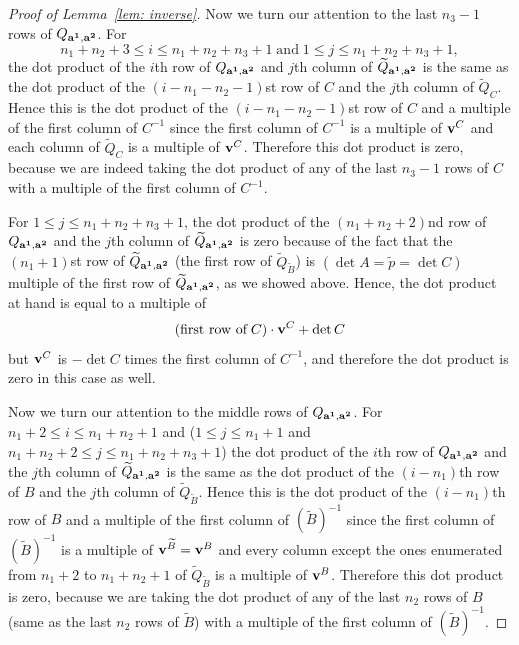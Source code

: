 \documentclass[11pt]{amsart}
\theoremstyle{plain}
\theoremstyle{definition}
\theoremstyle{remark}
\numberwithin{theorem}{section}
\begin{document}
\begin{proof} [Proof of Lemma~\ref{lem: inverse}]
Now we turn our attention to the last $n_3-1$  rows of $Q_{{\bf a^1}, {\bf a^2}}$. For $$n_1+n_2+3 \leq i \leq n_1+n_2+n_3+1\; \mbox{and}\; 1 \leq j \leq n_1+n_2+n_3+1,$$ the dot product of the $i$th row of $Q_{{\bf a^1}, {\bf a^2}}$ and $j$th  column of $\widetilde{Q}_{{\bf a^1}, {\bf a^2}}$ is the same as the dot product of the $(i-n_1-n_2-1)$st  row of $C$ and the  $j$th  column of $\widetilde{Q}_C$. Hence this is the dot product of the $(i-n_1-n_2-1)$st row of $C$ and a multiple of the first column of $C^{-1}$ since the first column of $C^{-1}$ is a multiple of ${\bf v}^C$ and  each column of  $\widetilde{Q}_C$ is a multiple of ${\bf v}^C$.  Therefore this dot product is zero,  because we are indeed taking the dot product of any of the last  $n_3-1$ rows of $C$ with a multiple of the first column of $C^{-1}$. 

For  $1 \leq j \leq n_1+n_2+n_3+1$, the dot product of the $(n_1+n_2+2)$nd row of $Q_{{\bf a^1}, {\bf a^2}}$ and the $j$th  column of $\widetilde{Q}_{{\bf a^1}, {\bf a^2}}$ is zero because of the fact that the $(n_1+1)$st row of  $\widetilde{Q}_{{\bf a^1}, {\bf a^2}}$ (the first row of $\widetilde{Q}_{\widetilde{B}}$) is $(\det A =\widetilde{p}=\det C)$ multiple of the first row of $\widetilde{Q}_{{\bf a^1}, {\bf a^2}}$, as we showed above.   Hence, the dot product at hand is equal to a multiple of $$(\mbox{first row of}\; C) \cdot {\bf v}^C + \det C$$ but ${\bf v}^C$ is $-\det C$ times the first column of $C^{-1}$, and therefore the dot product is zero in this case as well. 

Now we turn our attention to the middle rows of  $Q_{{\bf a^1}, {\bf a^2}}$. For $n_1+2 \leq i \leq n_1+n_2+1$ and ($1 \leq j \leq n_1+1$ and $n_1+n_2+2 \leq j \leq n_1+n_2+n_3+1$) the dot product of the $i$th row of $Q_{{\bf a^1}, {\bf a^2}}$ and the $j$th  column of $\widetilde{Q}_{{\bf a^1}, {\bf a^2}}$ is the same as the dot product of the $(i-n_1)$th row of $B$ and the  $j$th  column of  $\widetilde{Q}_{\widetilde{B}}$. Hence this is the dot product of the $(i-n_1)$th row of $B$ and a multiple of the first column of $(\widetilde{B})^{-1}$ since the first column of $(\widetilde{B})^{-1}$ is a multiple of ${\bf v}^{\widetilde{B}}={\bf v}^B$ and every column except the ones enumerated from $n_1+2$ to $n_1+n_2+1$ of  $\widetilde{Q}_{\widetilde{B}}$ is a multiple of ${\bf v}^B$. Therefore this dot product is zero, because we are taking the dot product of any of the last $n_2$ rows of $B$ (same as the last $n_2$ rows of  $\widetilde{B}$) with a multiple of the first column of $(\widetilde{B})^{-1}$. 


\end{proof}
\end{document}
